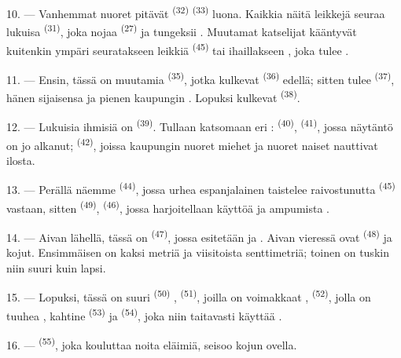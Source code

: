 10. --- Vanhemmat nuoret pitävät 
\textsuperscript{(32)}  \textsuperscript{(33)} luona. Kaikkia
näitä leikkejä seuraa lukuisa  \textsuperscript{(31)}, joka nojaa
 \textsuperscript{(27)}  ja tungeksii
. Muutamat katselijat kääntyvät kuitenkin ympäri seuratakseen
leikkiä  \textsuperscript{(45)} tai ihaillakseen
, joka tulee
.

11. --- Ensin, tässä on muutamia  \textsuperscript{(35)},
jotka kulkevat  \textsuperscript{(36)} edellä; sitten tulee
 \textsuperscript{(37)}, hänen sijaisensa ja pienen kaupungin
. Lopuksi kulkevat 
\textsuperscript{(38)}.

\VUsaut{5.0mm}
\VUsaut{3.6mm}

12. --- Lukuisia ihmisiä on  \textsuperscript{(39)}.
Tullaan katsomaan eri : 
\textsuperscript{(40)},  \textsuperscript{(41)}, jossa näytäntö
on jo alkanut;  \textsuperscript{(42)}, joissa
kaupungin nuoret miehet ja nuoret naiset nauttivat  ilosta.

13. --- Perällä näemme  \textsuperscript{(44)}, jossa urhea
espanjalainen  taistelee raivostunutta 
\textsuperscript{(45)} vastaan, sitten 
\textsuperscript{(49)},  \textsuperscript{(46)}, jossa
harjoitellaan  käyttöä ja ampumista .

14. --- Aivan lähellä, tässä on  \textsuperscript{(47)},
jossa esitetään  ja . Aivan vieressä ovat
 \textsuperscript{(48)} ja  kojut.
Ensimmäisen  on kaksi metriä ja viisitoista senttimetriä; toinen
on tuskin niin suuri kuin lapsi.

15. --- Lopuksi, tässä on suuri  \textsuperscript{(50)}
,  \textsuperscript{(51)}, joilla on
voimakkaat ,  \textsuperscript{(52)}, jolla
on tuuhea , kahtine  \textsuperscript{(53)}
ja  \textsuperscript{(54)}, joka niin taitavasti käyttää
.

16. ---  \textsuperscript{(55)}, joka kouluttaa noita
eläimiä, seisoo kojun ovella.
\VUsaut{6.0mm}
\VUfilet{22mm}
